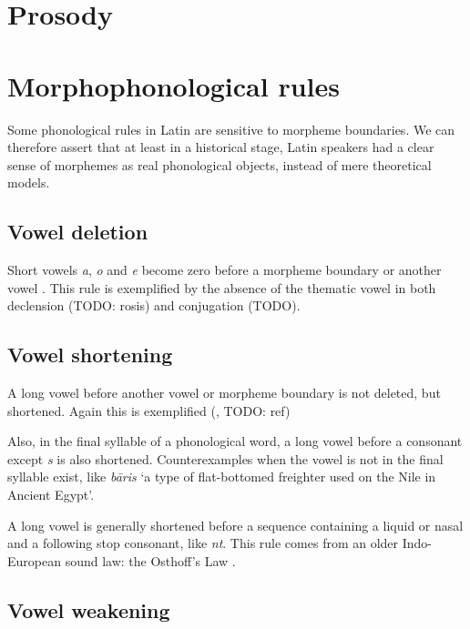 \documentclass[a4paper, oneside, 12pt]{report}
\newcommand*{\citesec}[1]{\S~{#1}}
\newcommand*{\citepage}[1]{p.~{#1}}
\newcommand{\form}[1]{\emph{#1}}
\newcommand{\translate}[1]{`#1'}
\begin{document}
\section{Prosody}



\section{Morphophonological rules}\label{sec:phonology.morphological}

Some phonological rules in Latin are sensitive to morpheme boundaries.
We can therefore assert that at least in a historical stage, 
Latin speakers had a clear sense of morphemes 
as real phonological objects,
instead of mere theoretical models.


\subsection{Vowel deletion}\label{sec:phonology.rule.deletion}

Short vowels \form{a}, \form{o} and \form{e} 
become zero before a morpheme boundary or another vowel
\citep[\citesec{8.3}]{oniga2014latin}.
This rule is exemplified by the absence 
of the thematic vowel in both declension (TODO: rosis)
and conjugation (TODO).

\subsection{Vowel shortening}\label{sec:phonology.rule.shortening}

A long vowel before another vowel or morpheme boundary 
is not deleted, but shortened.
Again this is exemplified (, TODO: ref)

Also, in the final syllable of a phonological word,
a long vowel before a consonant except \form{s} is also shortened.
Counterexamples when the vowel is not in the final syllable exist,
like \form{b\={a}ris} \translate{a type of flat-bottomed freighter used on the Nile in Ancient Egypt}.

A long vowel is generally shortened before a sequence 
containing a liquid or nasal and a following stop consonant,
like \form{nt}.
This rule comes from an older Indo-European sound law: 
the Osthoff's Law
\citep[\citepage{55}]{oniga2014latin}.

\subsection{Vowel weakening}
\end{document}
